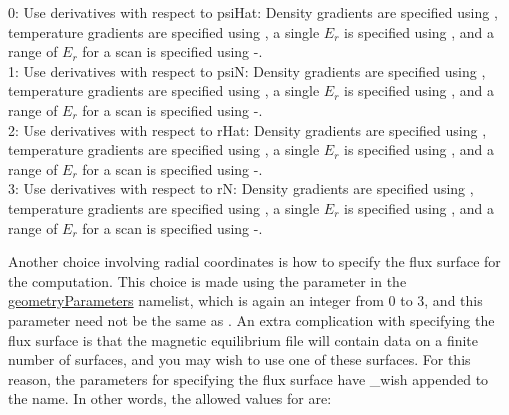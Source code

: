 {\setlength{\parindent}{0cm}

0: Use derivatives with respect to {\ttfamily psiHat}: Density gradients are specified using , 
temperature gradients are specified using ,  a single $E_r$ is specified using
, and a range of $E_r$ for a scan is specified using -.
\\

1: Use derivatives with respect to {\ttfamily psiN}: Density gradients are specified using , 
temperature gradients are specified using ,  a single $E_r$ is specified using
, and a range of $E_r$ for a scan is specified using -.
\\

2: Use derivatives with respect to {\ttfamily rHat}: Density gradients are specified using , 
temperature gradients are specified using ,  a single $E_r$ is specified using
, and a range of $E_r$ for a scan is specified using -.
\\

3: Use derivatives with respect to {\ttfamily rN}: Density gradients are specified using , 
temperature gradients are specified using ,  a single $E_r$ is specified using
, and a range of $E_r$ for a scan is specified using -.
\\

}

Another choice involving radial coordinates is how to specify the flux surface for the computation.
This choice is made using the parameter  in the {\ttfamily \hyperref[sec:geometryParameters]{geometryParameters}}
namelist, which is again an integer from 0 to 3, and this parameter need not be the same as .
An extra complication with specifying the flux surface is that the magnetic equilibrium file will contain data on a finite number of surfaces,
and you may wish to use one of these surfaces.  For this reason, the parameters for specifying the flux surface have {\ttfamily \_wish}
appended to the name. In other words, the allowed values for  are:\\

